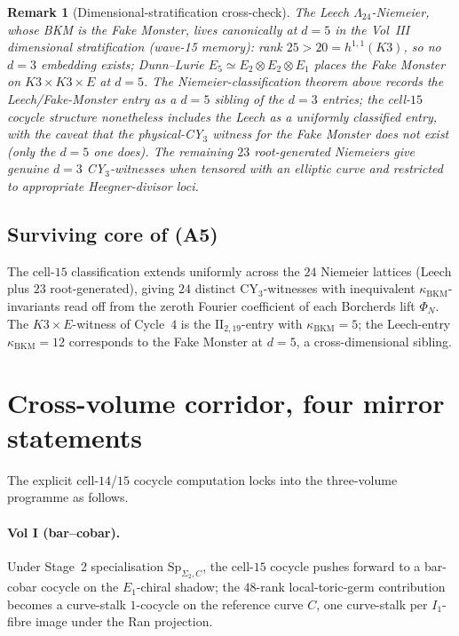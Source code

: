 \documentclass[11pt]{amsart}
\newtheorem{remark}[theorem]{Remark}
\providecommand{\kBKM}{\kappa_{\mathrm{BKM}}}
\begin{document}
\begin{remark}[Dimensional-stratification cross-check]
\label{rem:R13-dim-strat-crosscheck}
The Leech $\Lambda_{24}$-Niemeier, whose BKM is the Fake Monster,
lives canonically at $d = 5$ in the Vol~III dimensional stratification
(wave-15 memory): rank $25 > 20 = h^{1,1}(K3)$, so no $d = 3$
embedding exists; Dunn--Lurie $E_5 \simeq E_2 \otimes E_2 \otimes E_1$
places the Fake Monster on $K3 \times K3 \times E$ at $d = 5$. The
Niemeier-classification theorem above records the Leech/Fake-Monster
entry as a $d = 5$ sibling of the $d = 3$ entries; the cell-$15$
cocycle structure nonetheless includes the Leech as a uniformly
classified entry, with the caveat that the physical-CY$_3$ witness
for the Fake Monster does not exist (only the $d = 5$ one does).
The remaining $23$ root-generated Niemeiers give genuine $d = 3$
CY$_3$-witnesses when tensored with an elliptic curve and restricted
to appropriate Heegner-divisor loci.
\end{remark}

\subsection*{Surviving core of (A5)}

The cell-$15$ classification extends uniformly across the $24$ Niemeier
lattices (Leech plus $23$ root-generated), giving $24$ distinct
CY$_3$-witnesses with inequivalent $\kBKM$-invariants read off from
the zeroth Fourier coefficient of each Borcherds lift $\Phi_N$. The
$K3 \times E$-witness of Cycle~$4$ is the $\mathrm{II}_{2,19}$-entry
with $\kBKM = 5$; the Leech-entry $\kBKM = 12$ corresponds to the
Fake Monster at $d = 5$, a cross-dimensional sibling.

\section{Cross-volume corridor, four mirror statements}

The explicit cell-$14$/$15$ cocycle computation locks into the
three-volume programme as follows.

\paragraph{Vol I (bar--cobar).} Under Stage~2 specialisation
$\mathrm{Sp}_{\Sigma_2, C}$, the cell-$15$ cocycle pushes forward to a
bar-cobar cocycle on the $E_1$-chiral shadow; the $48$-rank local-toric-germ
contribution becomes a curve-stalk $1$-cocycle on the reference curve
$C$, one curve-stalk per $I_1$-fibre image under the Ran projection.
\end{document}
